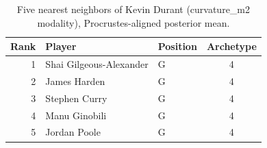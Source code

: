 \begin{table}[htbp]
  \centering\small
  \begin{tabular}{rllc}
    \toprule
    Rank & Player & Position & Archetype \\
    \midrule
    1 & Shai Gilgeous-Alexander & G & 4 \\
    2 & James Harden & G & 4 \\
    3 & Stephen Curry & G & 4 \\
    4 & Manu Ginobili & G & 4 \\
    5 & Jordan Poole & G & 4 \\
    \bottomrule
  \end{tabular}
  \caption{Five nearest neighbors of Kevin Durant (curvature_m2 modality), Procrustes-aligned posterior mean.}
  \label{tab:Kevin_Durant_neighbors_curvature_m2}
\end{table}

